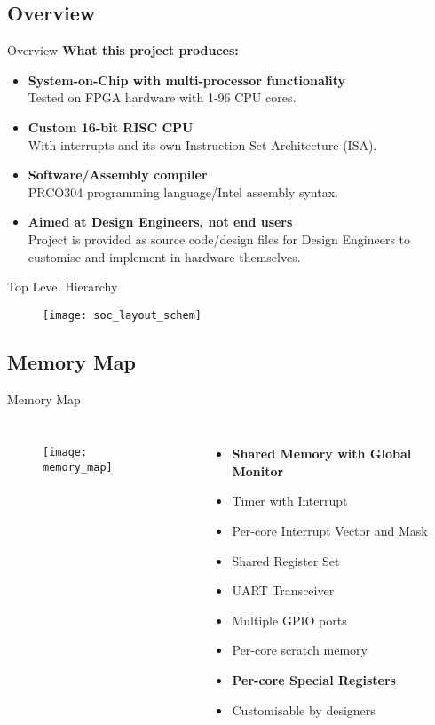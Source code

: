 \documentclass[aspectratio=169]{beamer}
\begin{document}
\subsection{Overview}
\begin{frame}{Overview}
\textbf{What this project produces:}
\begin{itemize}[<+->]\setlength\itemsep{1em}
    \item{\textbf{System-on-Chip with multi-processor functionality}\\
    Tested on FPGA hardware with 1-96 CPU cores.}
    
    \item{\textbf{Custom 16-bit RISC CPU}\\
    With interrupts and its own Instruction Set Architecture (ISA).}
    
    \item{\textbf{Software/Assembly compiler}\\
    PRCO304 programming language/Intel assembly syntax.}
    
    \item{\textbf{Aimed at Design Engineers, not end users}\\
    Project is provided as source code/design files for Design Engineers to customise and implement in hardware themselves.}
\end{itemize}
\end{frame}

\begin{frame}{Top Level Hierarchy}
\vspace{-.3cm}
\begin{figure}
\texttt{[image: soc\_layout\_schem]}
\end{figure}
\end{frame}

\subsection{Memory Map}
\begin{frame}{Memory Map}
\begin{columns}
\begin{figure}
\texttt{[image: memory\_map]}
\end{figure}
\begin{itemize}
    \item \textbf{Shared Memory with Global Monitor}
    \item Timer with Interrupt
    \item Per-core Interrupt Vector and Mask
    \item Shared Register Set
    \item UART Transceiver
    \item Multiple GPIO ports
    \item Per-core scratch memory
    \item \textbf{Per-core Special Registers}
    \item Customisable by designers
\end{itemize}
\end{columns}
\end{frame}
\end{document}
